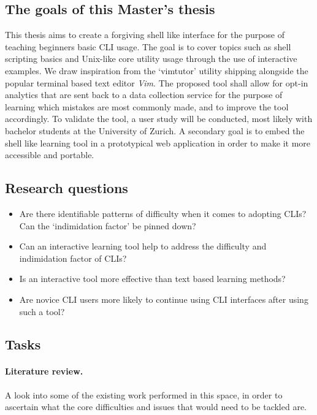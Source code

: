 \documentclass{task_description}
\begin{document}
\subsection*{The goals of this Master's thesis}

This thesis aims to create a forgiving shell like interface for the purpose of
teaching beginners basic CLI usage. The goal is to cover topics such as shell
scripting basics and Unix-like core utility usage through the use of
interactive examples. We draw inspiration from the `vimtutor'
\cite{pierce_ware_smith_moolenaar_2019} utility shipping alongside the popular
terminal based text editor \emph{Vim}. The proposed tool shall allow for opt-in
analytics that are sent back to a data collection service for the purpose of
learning which mistakes are most commonly made, and to improve the tool
accordingly. To validate the tool, a user study will be conducted, most likely
with bachelor students at the University of Zurich. A secondary goal is to
embed the shell like learning tool in a prototypical web application in order
to make it more accessible and portable.

\subsection*{Research questions}

\begin{itemize}
    \item Are there identifiable patterns of difficulty when it
        comes to adopting CLIs? Can the `indimidation factor' be pinned down?
    \item Can an interactive learning tool help to address the difficulty and
        indimidation factor of CLIs?
    \item Is an interactive tool more effective than text based learning
        methods?
    \item Are novice CLI users more likely to continue
        using CLI interfaces after using such a tool?
\end{itemize}

\subsection*{Tasks}

\paragraph{Literature review.} A look into some of the existing work performed in
this space, in order to ascertain what the core difficulties and issues that
would need to be tackled are. 
\end{document}
